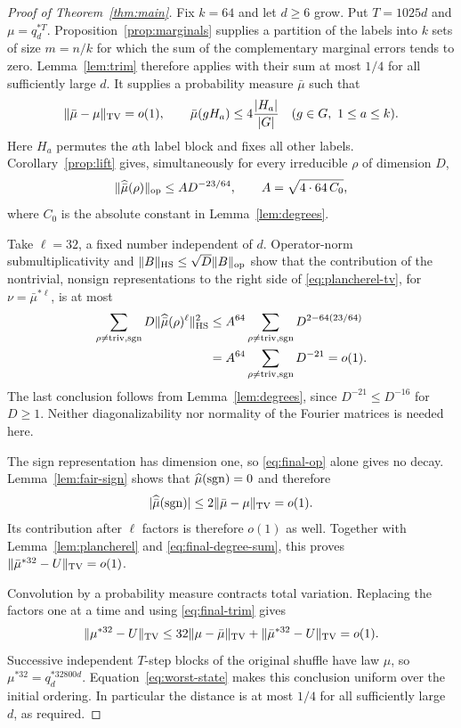 \begin{proof}[Proof of Theorem~\ref{thm:main}]
Fix
$k=64$ and let $d\ge6$ grow. Put $T=1025d$ and
$\mu=q_d^{*T}$. Proposition~\ref{prop:marginals} supplies a partition
of the labels into $k$ sets of size $m=n/k$ for which the sum of the
complementary marginal errors tends to zero. Lemma~\ref{lem:trim}
therefore applies with their sum at most $1/4$ for all sufficiently large
$d$. It supplies a probability measure $\bar\mu$ such that
\begin{equation}\label{eq:final-trim}
 \|\bar\mu-\mu\|_{\mathrm{TV}}=o(1),\qquad
 \bar\mu(gH_a)\le4\frac{|H_a|}{|G|}\quad(g\in G,\ 1\le a\le k).
\end{equation}
Here $H_a$ permutes the $a$th label block and fixes all other labels.
Corollary~\ref{prop:lift} gives,
simultaneously for every irreducible $\rho$ of dimension $D$,
\begin{equation}\label{eq:final-op}
 \|\widehat{\bar\mu}(\rho)\|_{\mathrm{op}}
 \le A D^{-23/64},\qquad A=\sqrt{4\cdot64\,C_0},
\end{equation}
where $C_0$ is the absolute constant in Lemma~\ref{lem:degrees}.

Take $\ell=32$, a fixed number independent of $d$. Operator-norm
submultiplicativity and $\|B\|_{\mathrm{HS}}\le\sqrt D\|B\|_{\mathrm{op}}$ show that
the contribution of the nontrivial, nonsign representations to the right
side of \eqref{eq:plancherel-tv}, for $\nu=\bar\mu^{*\ell}$, is at most
\begin{align}
 \sum_{\rho\ne\mathrm{triv},\operatorname{sgn}}
       D\|\widehat{\bar\mu}(\rho)^\ell\|_{\mathrm{HS}}^2
 &\le A^{64}\sum_{\rho\ne\mathrm{triv},\operatorname{sgn}}
       D^{2-64(23/64)}\notag\\
 &=A^{64}\sum_{\rho\ne\mathrm{triv},\operatorname{sgn}}D^{-21}=o(1).
 \label{eq:final-degree-sum}
\end{align}
The last conclusion follows from Lemma~\ref{lem:degrees}, since
$D^{-21}\le D^{-16}$ for $D\ge1$. Neither diagonalizability nor normality
of the Fourier matrices is needed here.

The sign representation has dimension one, so
\eqref{eq:final-op} alone gives no decay. Lemma~\ref{lem:fair-sign}
shows that $\widehat\mu(\operatorname{sgn})=0$ and therefore
\[
 |\widehat{\bar\mu}(\operatorname{sgn})|
 \le2\|\bar\mu-\mu\|_{\mathrm{TV}}=o(1).
\]
Its contribution after $\ell$ factors is therefore $o(1)$ as well.
Together with Lemma~\ref{lem:plancherel} and
\eqref{eq:final-degree-sum}, this proves
$\|\bar\mu^{*32}-U\|_{\mathrm{TV}}=o(1)$.

Convolution by a probability measure contracts total variation.
Replacing the factors one at a time and using \eqref{eq:final-trim} gives
\[
 \|\mu^{*32}-U\|_{\mathrm{TV}}
 \le32\|\mu-\bar\mu\|_{\mathrm{TV}}
       +\|\bar\mu^{*32}-U\|_{\mathrm{TV}}=o(1).
\]
Successive independent $T$-step blocks of the original shuffle have law
$\mu$, so $\mu^{*32}=q_d^{*32800d}$. Equation~\eqref{eq:worst-state}
makes this conclusion uniform over the initial ordering. In particular
the distance is at most $1/4$ for all sufficiently large $d$, as required.
\end{proof}

